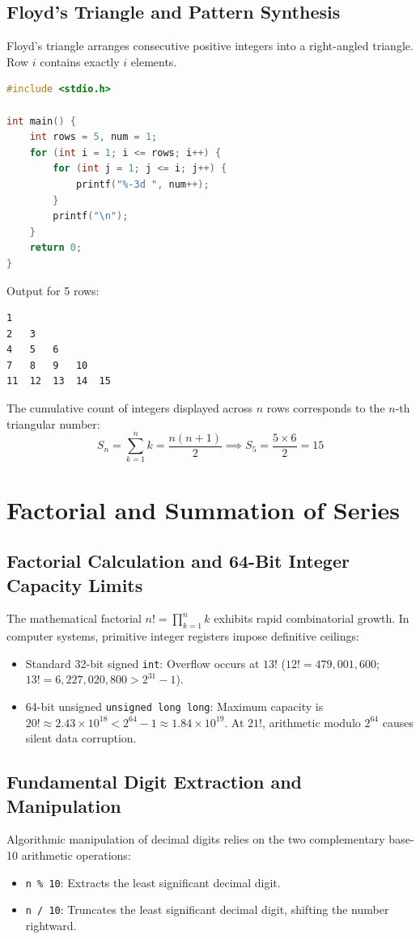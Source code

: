 \subsection{Floyd's Triangle and Pattern Synthesis}
Floyd's triangle arranges consecutive positive integers into a right-angled triangle. Row $i$ contains exactly $i$ elements.

\begin{lstlisting}[language=C]
#include <stdio.h>

int main() {
    int rows = 5, num = 1;
    for (int i = 1; i <= rows; i++) {
        for (int j = 1; j <= i; j++) {
            printf("%-3d ", num++);
        }
        printf("\n");
    }
    return 0;
}
\end{lstlisting}
Output for 5 rows:
\begin{lstlisting}
1   
2   3   
4   5   6   
7   8   9   10  
11  12  13  14  15  
\end{lstlisting}
The cumulative count of integers displayed across $n$ rows corresponds to the $n$-th triangular number:
\[
S_n = \sum_{k=1}^{n} k = \frac{n(n+1)}{2} \implies S_5 = \frac{5 \times 6}{2} = 15
\]

\section{Factorial and Summation of Series}
\label{sec:factorial_summation_series}

\subsection{Factorial Calculation and 64-Bit Integer Capacity Limits}
The mathematical factorial $n! = \prod_{k=1}^{n} k$ exhibits rapid combinatorial growth. In computer systems, primitive integer registers impose definitive ceilings:
\begin{itemize}[leftmargin=*]
    \item Standard 32-bit signed \texttt{int}: Overflow occurs at $13!$ ($12! = 479,001,600$; $13! = 6,227,020,800 > 2^{31}-1$).
    \item 64-bit unsigned \texttt{unsigned long long}: Maximum capacity is $20! \approx 2.43 \times 10^{18} < 2^{64}-1 \approx 1.84 \times 10^{19}$. At $21!$, arithmetic modulo $2^{64}$ causes silent data corruption.
\end{itemize}

\subsection{Fundamental Digit Extraction and Manipulation}
Algorithmic manipulation of decimal digits relies on the two complementary base-10 arithmetic operations:
\begin{itemize}[leftmargin=*]
    \item \texttt{n \% 10}: Extracts the least significant decimal digit.
    \item \texttt{n / 10}: Truncates the least significant decimal digit, shifting the number rightward.
\end{itemize}

